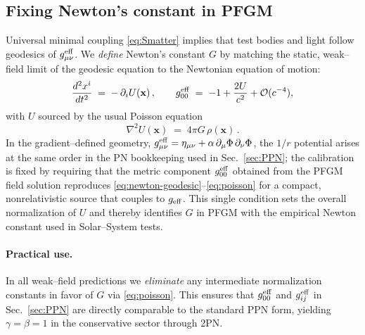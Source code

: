 \documentclass{article}
\begin{document}
\subsection{Fixing Newton’s constant in PFGM}
\label{subsec:fixG}
Universal minimal coupling \eqref{eq:Smatter} implies that test bodies and light follow geodesics of $g^{\rm eff}_{\mu\nu}$. We \emph{define} Newton’s constant $G$ by matching the static, weak–field limit of the geodesic equation to the Newtonian equation of motion:
\begin{equation}
\frac{d^2 x^i}{dt^2} \;=\; -\,\partial_i U(\mathbf{x}) \,,
\qquad
g^{\rm eff}_{00} \;=\; -1 + \frac{2U}{c^2} + \mathcal{O}(c^{-4}),
\label{eq:newton-geodesic}
\end{equation}
with $U$ sourced by the usual Poisson equation
\begin{equation}
\nabla^2 U(\mathbf{x}) \;=\; 4\pi G\,\rho(\mathbf{x}) \, .
\label{eq:poisson}
\end{equation}
In the gradient–defined geometry, $g^{\rm eff}_{\mu\nu}=\eta_{\mu\nu}+\alpha\,\partial_\mu\Phi\,\partial_\nu\Phi$, the $1/r$ potential arises at the same order in the PN bookkeeping used in Sec.~\ref{sec:PPN}; the calibration is fixed by requiring that the metric component $g^{\rm eff}_{00}$ obtained from the PFGM field solution reproduces \eqref{eq:newton-geodesic}–\eqref{eq:poisson} for a compact, nonrelativistic source that couples to $g_{\rm eff}$. This single condition sets the overall normalization of $U$ and thereby identifies $G$ in PFGM with the empirical Newton constant used in Solar–System tests.

\paragraph{Practical use.} In all weak–field predictions we \emph{eliminate} any intermediate normalization constants in favor of $G$ via \eqref{eq:poisson}. This ensures that $g^{\rm eff}_{00}$ and $g^{\rm eff}_{ij}$ in Sec.~\ref{sec:PPN} are directly comparable to the standard PPN form, yielding $\gamma=\beta=1$ in the conservative sector through 2PN.
\end{document}
